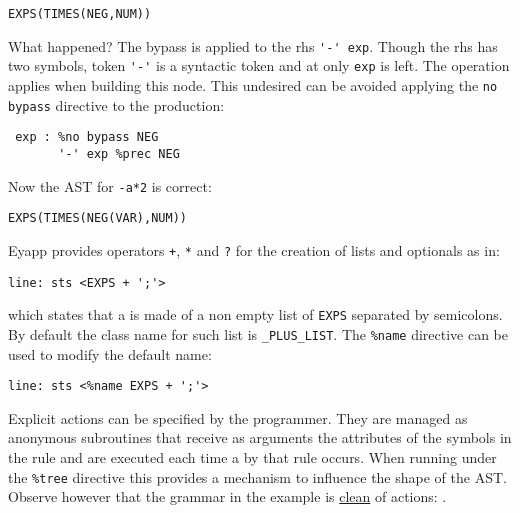 \begin{verbatim}
EXPS(TIMES(NEG,NUM))
\end{verbatim}

What happened? The bypass is applied to the rhs 
\verb|'-' exp|.  Though the rhs has two symbols, token \verb|'-'| is
a syntactic token and at 
only \verb|exp| is left. The 
operation applies when building this node.
This undesired  can be avoided applying 
the \verb|no bypass| directive to the 
production:

\begin{verbatim}
 exp : %no bypass NEG
       '-' exp %prec NEG
\end{verbatim}
Now the AST for \verb|-a*2| is correct:
\begin{verbatim}
EXPS(TIMES(NEG(VAR),NUM))
\end{verbatim}

Eyapp provides operators \verb|+|, \verb|*| and \verb|?| 
for the creation of lists and optionals as in:
\begin{verbatim}
line: sts <EXPS + ';'>
\end{verbatim}
which states that a  is made of a non empty
list of \verb|EXPS| separated by semicolons.
By default the class name for such list is \verb|_PLUS_LIST|.
The \verb|%name| directive can be used to modify
the default name:
\begin{verbatim}
line: sts <%name EXPS + ';'>
\end{verbatim}

Explicit actions can be specified by the programmer. 
They are managed as anonymous subroutines
that receive as arguments the attributes of the symbols
in the rule and are executed each time a 
by that rule occurs. When running under the \verb|%tree| directive
this provides a mechanism to influence the shape of the AST.
Observe however that the grammar in the example is \underline{clean} of actions:
.
